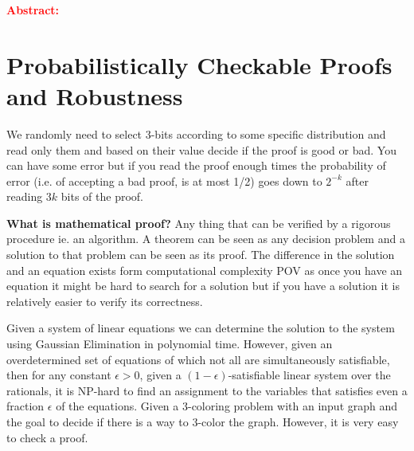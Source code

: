 \textcolor{red}{\textbf{Abstract:} }
\section{Probabilistically Checkable Proofs and Robustness}
We randomly need to select 3-bits according to some specific distribution and read only them and based on their value decide if the proof is good or bad. You can have some error but if you read the proof enough times the probability of error (i.e. of accepting a bad proof, is at most 1/2) goes down to $2^{-k}$ after reading $3k$ bits of the proof. 

\textbf{What is mathematical proof?} Any thing that can be verified by a rigorous procedure ie. an algorithm. A theorem can be seen as any decision problem and a solution to that problem can be seen as its proof. The difference in the solution and an equation exists form computational complexity POV as once you have an equation it might be hard to search for a solution but if you have a solution it is relatively easier to verify its correctness.

Given a system of linear equations we can determine the solution to the system using Gaussian Elimination in polynomial time. However, given an overdetermined set of equations of which not all are simultaneously satisfiable, then for any constant $\epsilon > 0$, given a $(1 − \epsilon)$-satisfiable linear system over the rationals, it is NP-hard to find an assignment to the variables that satisfies even a fraction $\epsilon$ of the equations. Given a 3-coloring problem with an input graph and the goal to decide if there is a way to 3-color the graph. However, it is very easy to check a proof.


 